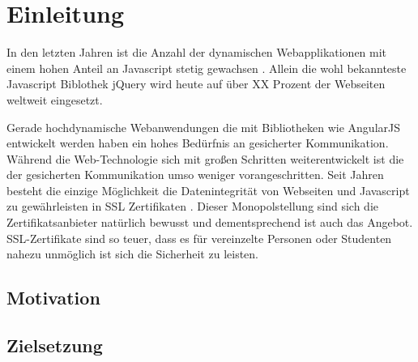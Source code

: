 
\section{Einleitung}





In den letzten Jahren ist die Anzahl der dynamischen Webapplikationen mit einem hohen Anteil an Javascript stetig gewachsen \quelle.
Allein die wohl bekannteste Javascript Biblothek jQuery \urlref wird heute auf über XX Prozent der Webseiten weltweit eingesetzt. \quelle

Gerade hochdynamische Webanwendungen die mit Bibliotheken wie AngularJS \urlref entwickelt werden haben ein hohes Bedürfnis an gesicherter Kommunikation.
Während die Web-Technologie sich mit großen Schritten weiterentwickelt ist die der gesicherten Kommunikation umso weniger vorangeschritten.
Seit Jahren besteht die einzige Möglichkeit die Datenintegrität von Webseiten und Javascript zu gewährleisten in SSL Zertifikaten .
Dieser Monopolstellung sind sich die Zertifikatsanbieter natürlich bewusst und dementsprechend ist auch das Angebot.
SSL-Zertifikate sind so teuer, dass es für vereinzelte Personen oder Studenten nahezu unmöglich ist sich die Sicherheit zu leisten.


\subsection{Motivation}
\tbd


\subsection{Zielsetzung}

